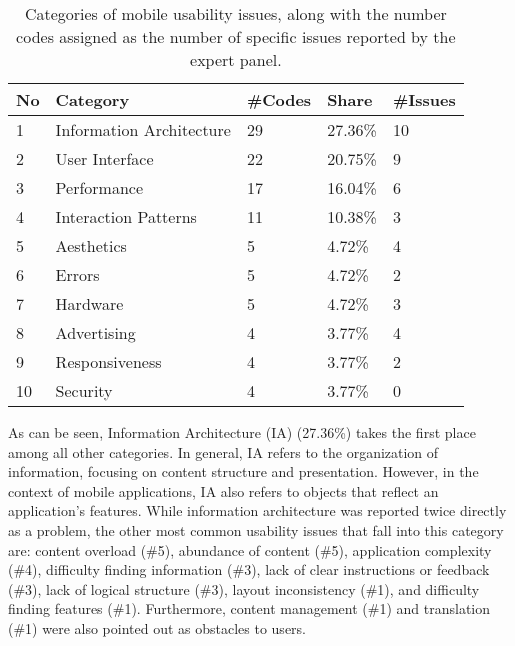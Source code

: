 \documentclass[preprint,12pt,number]{elsarticle}
\begin{document}
\begin{table}[h]
\caption{Categories of mobile usability issues, along with the number codes assigned as the number of specific issues reported by the expert panel.}
\label{tab:RQ1-resutls}
\footnotesize
\centering
\begin{tabular}{|l|l|l|l|l|}
\hline
\textbf{No} & \textbf{Category}    & \textbf{\#Codes} & \textbf{Share}    & \textbf{\#Issues} \\ \hline
1  & Information Architecture & 29      & 27.36\%  & 10        \\ \hline
2  & User Interface           & 22      & 20.75\%  & 9        \\ \hline
3  & Performance              & 17      & 16.04\%  & 6        \\ \hline
4  & Interaction Patterns     & 11      & 10.38\%  & 3        \\ \hline
5  & Aesthetics               & 5       & 4.72\%   & 4        \\ \hline
6  & Errors                   & 5       & 4.72\%   & 2        \\ \hline
7  & Hardware                 & 5       & 4.72\%   & 3        \\ \hline
8  & Advertising              & 4       & 3.77\%   & 4        \\ \hline
9  & Responsiveness           & 4       & 3.77\%   & 2        \\ \hline
10 & Security                 & 4       & 3.77\%   & 0        \\ \hline
\end{tabular}
\end{table}

As can be seen, Information Architecture (IA) (27.36\%) takes the first place among all other categories. In general, IA refers to the organization of information, focusing on content structure and presentation. However, in the context of mobile applications, IA also refers to objects that reflect an application's features. 
While information architecture was reported twice directly as a problem, the other most common usability issues that fall into this category are: content overload (\#5), abundance of content (\#5), application complexity (\#4), difficulty finding information (\#3), lack of clear instructions or feedback (\#3), lack of logical structure (\#3), layout inconsistency (\#1), and difficulty finding features (\#1). Furthermore, content management (\#1) and translation (\#1) were also pointed out as obstacles to users.
\end{document}
